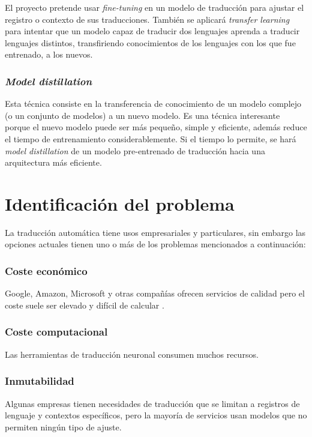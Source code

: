 El proyecto pretende usar \textit{fine-tuning} en un modelo de traducción para ajustar el registro
o contexto de sus traducciones. También se aplicará \textit{transfer learning} para intentar que un modelo
capaz de traducir dos lenguajes aprenda a traducir lenguajes distintos, transfiriendo conocimientos de los
lenguajes con los que fue entrenado, a los nuevos.

\subsubsection{\textit{Model distillation}}
Esta técnica consiste en la transferencia de conocimiento de un modelo complejo (o un conjunto de modelos)
a un nuevo modelo.
Es una técnica interesante porque el nuevo modelo puede ser más pequeño, simple y eficiente,
además reduce el tiempo de entrenamiento considerablemente.
Si el tiempo lo permite, se hará \textit{model distillation} de un modelo pre-entrenado de traducción
hacia una arquitectura más eficiente.




\section{Identificación del problema}\label{problem}
La traducción automática tiene usos empresariales y particulares, sin embargo las opciones
actuales tienen uno o más de los problemas mencionados a continuación:

\subsubsection{Coste económico}
Google, Amazon, Microsoft y otras compañías ofrecen servicios de calidad pero el coste
suele ser elevado y difícil de calcular
\cite{GoogleTranslatePricing,AWSTranslatePricing,MicrosoftTranslatePricing}.

\subsubsection{Coste computacional}
Las herramientas de traducción neuronal consumen muchos recursos.

\subsubsection{Inmutabilidad}
Algunas empresas tienen necesidades de traducción que se limitan a registros de
lenguaje y contextos específicos, pero la mayoría de servicios usan modelos que no
permiten ningún tipo de ajuste.

